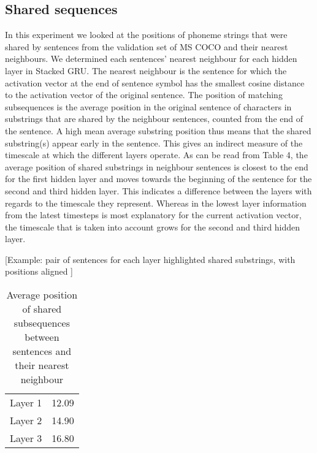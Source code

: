 \subsection{Shared sequences}
In this experiment we looked at the positions of phoneme strings that were shared by sentences from the validation set of MS COCO and their nearest neighbours. We determined each sentences' nearest neighbour for each hidden layer in {\sc Stacked GRU}. The nearest neighbour is the sentence for which the activation vector at the end of sentence symbol has the smallest cosine distance to the activation vector of the original sentence. The position of matching subsequences is the average position in the original sentence of characters in substrings that are shared by the neighbour sentences, counted from the end of the sentence. A high mean average substring position thus means that the shared substring(s) appear early in the sentence. This gives an indirect measure of the timescale at which the different layers operate. 
As can be read from Table 4, the average position of shared substrings in neighbour sentences is closest to the end for the first hidden layer and moves towards the beginning of the sentence for the second and third hidden layer. This indicates a difference between the layers with regards to the timescale they represent. Whereas in the lowest layer information from the latest timesteps is most explanatory for the current activation vector, the timescale that is taken into account grows for the second and third hidden layer. 

[Example: pair of sentences for each layer
highlighted shared substrings, with positions aligned ]

\begin{table}[]
	\centering
	\begin{tabular}{cc}
		Layer 1 & 12.09 \\
		Layer 2 & 14.90 \\
		Layer 3 & 16.80
	\end{tabular}
	\caption{Average position of shared subsequences between sentences and their nearest neighbour}
\end{table}